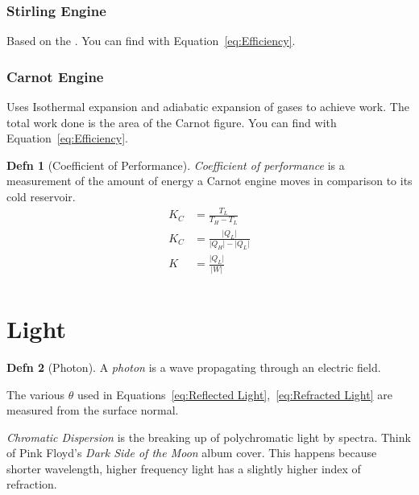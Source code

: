 \documentclass[10pt,letterpaper,final,twoside,notitlepage]{article}
\numberwithin{equation}{section} %
\theoremstyle{definition}
\newtheorem{definition}{Defn} %
\theoremstyle{remark}
\begin{document}
		\subsubsection{Stirling Engine} \label{subsubsec:Stirling Engine}
		Based on the .
		You can find  with Equation~\eqref{eq:Efficiency}.
		
		\subsubsection{Carnot Engine} \label{subsubsec:Carnot Engine}
		Uses Isothermal expansion and adiabatic expansion of gases to achieve work.
		The total work done is the area of the Carnot figure.
		You can find  with Equation~\eqref{eq:Efficiency}.
		
			\begin{definition}[Coefficient of Performance] \label{def:Coefficient of Performance}
				\emph{Coefficient of performance} is a measurement of the amount of energy a Carnot engine moves in comparison to its cold reservoir.
				\begin{equation} \label{eq:Coefficient of Performance}
					\begin{aligned}
						K_{C} &= \frac{T_{L}}{T_{H} - T_{L}} \\
						K_{C} &= \frac{\lvert Q_{L} \rvert}{\lvert Q_{H} \rvert - \lvert Q_{L} \rvert} \\
						K &= \frac{\lvert Q_{L} \rvert}{\lvert W \rvert} \\
					\end{aligned}
				\end{equation}
			\end{definition}
		
\section{Light} \label{sec:Light}
	\begin{definition}[Photon]
		A \emph{photon} is a wave propagating through an electric field.
	\end{definition}
The various $\theta$ used in Equations~\eqref{eq:Reflected Light},~\eqref{eq:Refracted Light} are measured from the surface normal.

\emph{Chromatic Dispersion} is the breaking up of polychromatic light by spectra.
Think of Pink Floyd's \textit{Dark Side of the Moon} album cover.
This happens because shorter wavelength, higher frequency light has a slightly higher index of refraction.
\end{document}
